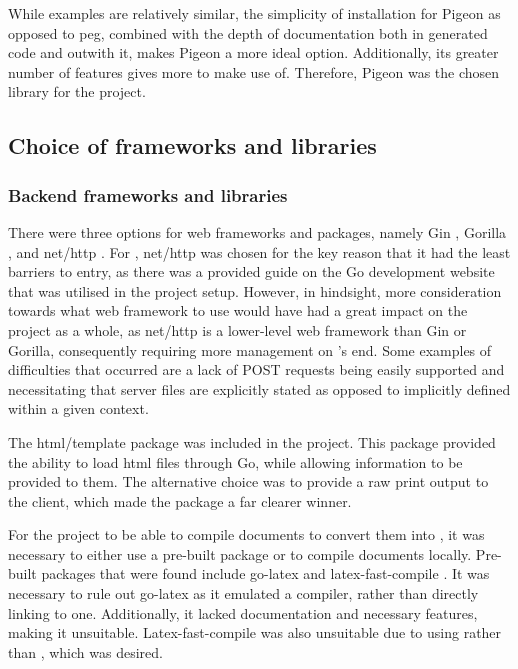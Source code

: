 

While examples are relatively similar, the simplicity of installation for Pigeon as opposed to \acrshort{peg}, combined with the depth of documentation both in generated code and outwith it, makes Pigeon a more ideal option. Additionally, its greater number of features gives \lintexspaced more to make use of. Therefore, Pigeon was the chosen library for the project.

\subsection{Choice of frameworks and libraries}
\subsubsection{Backend frameworks and libraries}
There were three options for web frameworks and packages, namely Gin \parencite{go-gin}, Gorilla \parencite{gorilla-mux}, and net/http \parencite{net-http}. For \lintex , net/http was chosen for the key reason that it had the least barriers to entry, as there was a provided guide on the Go development website that was utilised in the project setup. However, in hindsight, more consideration towards what web framework to use would have had a great impact on the project as a whole, as net/http is a lower-level web framework than Gin or Gorilla, consequently requiring more management on \lintex's end. Some examples of difficulties that occurred are a lack of POST requests being easily supported and necessitating that server files are explicitly stated as opposed to implicitly defined within a given context.

The html/template \parencite{html-template} package was included in the project. This package provided the ability to load \acrfull{html} files through Go, while allowing information to be provided to them. The alternative choice was to provide a raw print output to the client, which made the package a far clearer winner.

For the project to be able to compile \latexspaced documents to convert them into , it was necessary to either use a pre-built package or to compile \latexspaced documents locally. Pre-built packages that were found include go-latex \parencite{go-latex} and latex-fast-compile \parencite{latex-fast-compile}. It was necessary to rule out go-latex as it emulated a \latexspaced compiler, rather than directly linking to one. Additionally, it lacked documentation and necessary features, making it unsuitable. Latex-fast-compile was also unsuitable due to using \pdflatexspaced rather than \lualatexspaced, which was desired.

